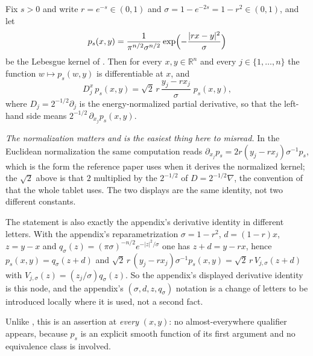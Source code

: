 \begin{lemma}
Fix $s > 0$ and write $r = e^{-s} \in (0,1)$ and $\sigma = 1 - e^{-2s} = 1-r^2 \in (0,1)$,
and let
\[
  p_s(x,y) = \frac{1}{\pi^{n/2}\sigma^{n/2}}
    \exp\Bigl(-\frac{|rx-y|^2}{\sigma}\Bigr)
\]
be the Lebesgue kernel of .  Then for every
$x, y \in \mathbb{R}^n$ and every $j \in \{1,\ldots,n\}$ the function
$w \mapsto p_s(w,y)$ is differentiable at $x$, and
\[
  D_j^x\,p_s(x,y)
    = \sqrt2\,r\,\frac{y_j - r x_j}{\sigma}\;p_s(x,y) ,
\]
where $D_j = 2^{-1/2}\partial_j$ is the energy-normalized partial derivative, so
that the left-hand side means $2^{-1/2}\,\partial_{x_j}p_s(x,y)$.

\emph{The normalization matters and is the easiest thing here to misread.}  In
the Euclidean normalization the same computation reads
$\partial_{x_j}p_s = 2r(y_j-rx_j)\sigma^{-1}p_s$, which is the form the reference
paper uses when it derives the normalized kernel; the $\sqrt2$ above is that $2$
multiplied by the $2^{-1/2}$ of $D = 2^{-1/2}\nabla$, the convention of
 that the whole tablet uses.  The two displays are the same
identity, not two different constants.

The statement is also exactly the appendix's derivative identity in different
letters.  With the appendix's reparametrization $\sigma = 1-r^2$, $d = (1-r)x$,
$z = y-x$ and $q_\sigma(z) = (\pi\sigma)^{-n/2}e^{-|z|^2/\sigma}$ one has
$z + d = y - rx$, hence $p_s(x,y) = q_\sigma(z+d)$ and
$\sqrt2\,r\,(y_j-rx_j)\sigma^{-1}p_s(x,y) = \sqrt2\,r\,V_{j,\sigma}(z+d)$ with
$V_{j,\sigma}(z) = (z_j/\sigma)q_\sigma(z)$.  So the appendix's displayed
derivative identity is this node, and the appendix's $(\sigma, d, z, q_\sigma)$
notation is a change of letters to be introduced locally where it is used, not a
second fact.

Unlike , this is an assertion at \emph{every}
$(x,y)$: no almost-everywhere qualifier appears, because $p_s$ is an explicit
smooth function of its first argument and no equivalence class is involved.
\end{lemma}
